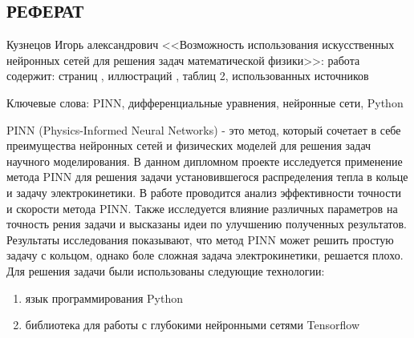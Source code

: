 \documentclass[a4paper,14pt]{extarticle} %
\author{Кузнецов Игорь}
\title{}
\date{\today}
\newcommand\blankpage{%
    \null
    \thispagestyle{empty}%
    \newpage}
\begin{document}
\def\figurename{Рисунок}
\newcommand{\brv}[1]{{\left| #1 \right|}}
\newcommand{\brr}[1]{{\left( #1 \right)}}
\newcommand{\brs}[1]{{\left[ #1 \right]}}
\newcommand{\brc}[1]{{\left\{ #1 \right\}}}
\newcommand{\brn}[1]{{\left\lVert #1 \right\rVert}}
\newcommand{\bra}[1]{{\left\langle #1 \right\rangle}}
\newcommand{\brrl}[1]{{\left( #1 \right]}}
\newcommand{\brrr}[1]{{\left[ #1 \right)}}
\newcommand{\under}[2]{{\underset{#2}{\underbrace{#1}}}}
\newcommand{\strm}[1]{\underset{#1}{\rightarrow}}
% 


\addtocounter{page}{1}%

\newpage
\begin{center}
    \section*{РЕФЕРАТ}
\end{center}

Кузнецов Игорь александрович <<Возможность использования искусственных нейронных сетей для решения задач математической физики>>:  работа содержит: страниц , иллюстраций , таблиц 2, использованных источников 

\noindent Ключевые слова: PINN, дифференциальные уравнения, нейронные сети, Python %

PINN (Physics-Informed Neural Networks) - это метод, который сочетает в себе преимущества нейронных сетей и физических моделей для решения задач научного моделирования. В данном дипломном проекте исследуется применение метода PINN для решения задачи установившегося распределения тепла в кольце и задачу электрокинетики. В работе проводится анализ эффективности точности и скорости метода PINN. Также исследуется влияние различных параметров на точность рения задачи и высказаны идеи по улучшению полученных результатов. Результаты исследования показывают, что метод PINN может решить простую задачу с кольцом, однако боле сложная задача электрокинетики, решается плохо. %
Для решения задачи были использованы следующие технологии:
\begin{enumerate}[label={\arabic*)}]
    \item язык программирования Python
    \item библиотека для работы с глубокими нейронными сетями Tensorflow
\end{enumerate}
\end{document}
